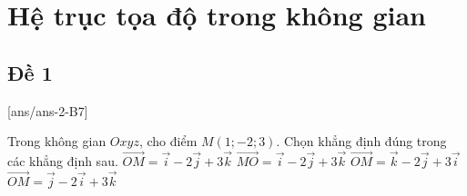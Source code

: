 \setcounter{section}{6}
\section{Hệ trục tọa độ trong không gian}
\subsection{Đề 1}
[ans/ans-2-B7]
\caulc
\begin{ex}%
	Trong không gian $Oxyz$, cho điểm $ M\left(1;-2;3\right) $. Chọn khẳng định đúng trong các khẳng định sau.
	\choice
	{\True $ \overrightarrow{OM}= \overrightarrow{i}- 2\overrightarrow{j}+ 3\overrightarrow{k}$}
	{$ \overrightarrow{MO}= \overrightarrow{i}- 2\overrightarrow{j}+ 3\overrightarrow{k}$}
	{$ \overrightarrow{OM}= \overrightarrow{k}- 2\overrightarrow{j}+ 3\overrightarrow{i}$}
	{$ \overrightarrow{OM}= \overrightarrow{j}- 2\overrightarrow{i}+ 3\overrightarrow{k}$}
\end{ex}


